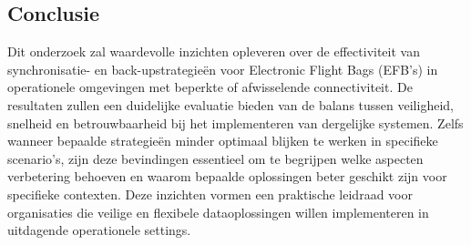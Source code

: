 \subsection{Conclusie}
Dit onderzoek zal waardevolle inzichten opleveren over de effectiviteit van synchronisatie- en back-upstrategieën voor Electronic Flight Bags (EFB's) in operationele omgevingen met beperkte of afwisselende connectiviteit. De resultaten zullen een duidelijke evaluatie bieden van de balans tussen veiligheid, snelheid en betrouwbaarheid bij het implementeren van dergelijke systemen. Zelfs wanneer bepaalde strategieën minder optimaal blijken te werken in specifieke scenario's, zijn deze bevindingen essentieel om te begrijpen welke aspecten verbetering behoeven en waarom bepaalde oplossingen beter geschikt zijn voor specifieke contexten. Deze inzichten vormen een praktische leidraad voor organisaties die veilige en flexibele dataoplossingen willen implementeren in uitdagende operationele settings.


